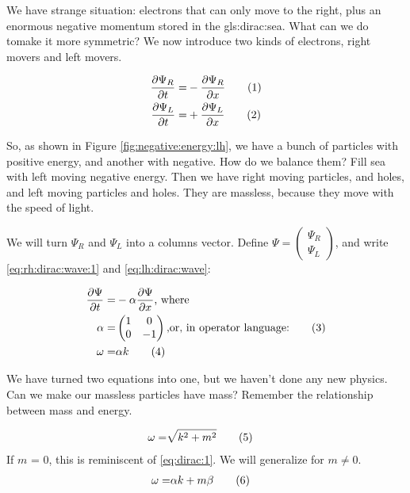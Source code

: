 \documentclass[]{article}
\newcommand\numberthis{\addtocounter{equation}{1}\tag{\theequation}}
\begin{document}
We have strange situation: electrons that can only move to the right, plus an enormous negative momentum stored in the \gls{gls:dirac:sea}. What can we do tomake it more symmetric? We now introduce two kinds of electrons, right movers and left movers.

\begin{align*}
	\frac{\partial \Psi_R}{\partial t} =& -\frac{\partial \Psi_R}{\partial x} \numberthis \label{eq:rh:dirac:wave:1}\\
	\frac{\partial \Psi_L}{\partial t} =& + \frac{\partial \Psi_L}{\partial x} \numberthis \label{eq:lh:dirac:wave}
\end{align*}

So, as shown in Figure \ref{fig:negative:energy:lh}, we have a bunch of particles with positive energy, and another with negative. How do we balance them? Fill sea with left moving negative energy. Then we have right moving particles, and holes, and left moving particles and holes. They are massless, because they move with the speed of light.

We will turn $\Psi_R$ and $\Psi_L$ into a columns vector. Define $\Psi=\begin{pmatrix}
	\Psi_R\\
	\Psi_L
\end{pmatrix}$, and write \eqref{eq:rh:dirac:wave:1} and \eqref{eq:lh:dirac:wave}:

\begin{align*}
	\frac{\partial \Psi}{\partial t} =& - \alpha \frac{\partial \Psi}{\partial x} \text{, where}\\
	\alpha =& \begin{pmatrix}
		1&0\\
		0&-1
	\end{pmatrix} \text{,or, in operator language:} \numberthis\label{eq:alpha}\\
	\omega =& \alpha k \numberthis \label{eq:dirac:1}
\end{align*}

We have turned two equations into one, but we haven't done any new physics. Can we make our massless particles have mass? Remember the relationship between mass and energy.

\begin{align*}
	\omega =& \sqrt{k^2 + m^2}  \numberthis \label{eq:omega:relativistic}
\end{align*}
If $m$ = 0, this is reminiscent of \eqref{eq:dirac:1}. We will generalize for $m\ne0$.
\begin{align*} 
	\omega =& \alpha k + m \beta  \numberthis \label{eq:Dirac:1D}
\end{align*}
\end{document}
